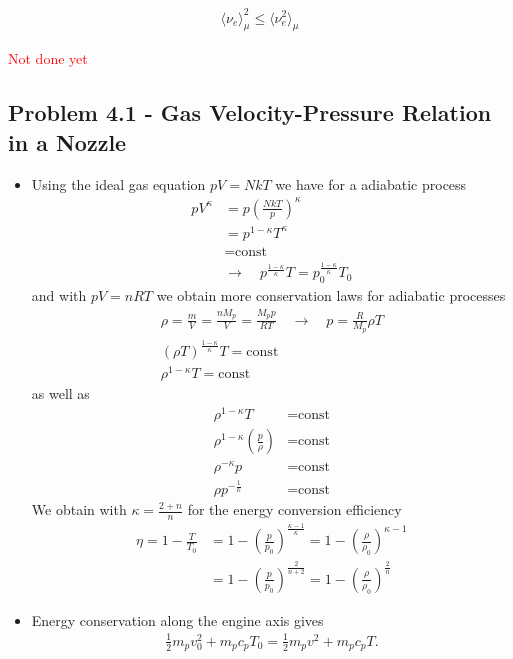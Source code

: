 \documentclass[../main.tex]{subfiles}
\begin{document}
\begin{align}
    \langle \nu_e\rangle_\mu^2\le\langle \nu_e^2\rangle_\mu    
\end{align}

\textcolor{red}{Not done yet}

\subsection{Problem 4.1 - Gas Velocity-Pressure Relation in a Nozzle}
\begin{itemize}
\item Using the ideal gas equation $pV=NkT$ we have for a adiabatic process
\begin{align}
    pV^\kappa&=p\left(\frac{NkT}{p}\right)^\kappa\\
    &=p^{1-\kappa}T^\kappa\\
    &=\text{const}\\
    &\rightarrow\quad p^\frac{1-\kappa}{\kappa}T=p_0^\frac{1-\kappa}{\kappa}T_0
\end{align}
and with $pV=nRT$ we obtain more conservation laws for adiabatic processes
\begin{align}
    \rho=\frac{m}{V}=\frac{nM_p}{V}=\frac{M_pp}{RT}\quad\rightarrow\quad p=\frac{R}{M_p}\rho T\\
    (\rho T)^\frac{1-\kappa}{\kappa}T=\text{const}\\
    \rho^{1-\kappa}T=\text{const}
\end{align}
as well as
\begin{align}
    \rho^{1-\kappa}T&=\text{const}\\
    \rho^{1-\kappa}\left(\frac{p}{\rho}\right)&=\text{const}\\
    \rho^{-\kappa}p&=\text{const}\\
    \rho p^{-\frac{1}{\kappa}}&=\text{const}
\end{align}
We obtain with $\kappa=\frac{2+n}{n}$ for the energy conversion efficiency 
\begin{align}
    \eta=1-\frac{T}{T_0}&=1-\left(\frac{p}{p_0}\right)^\frac{\kappa-1}{\kappa}=1-\left(\frac{\rho}{\rho_0}\right)^{\kappa-1}\\
    &=1-\left(\frac{p}{p_0}\right)^\frac{2}{n+2}=1-\left(\frac{\rho}{\rho_0}\right)^\frac{2}{n}
\end{align}
\item Energy conservation along the engine axis gives
\begin{align}
    \frac{1}{2}m_pv_0^2+m_pc_pT_0=\frac{1}{2}m_pv^2+m_pc_pT.

\end{align}
\end{itemize}
\end{document}
